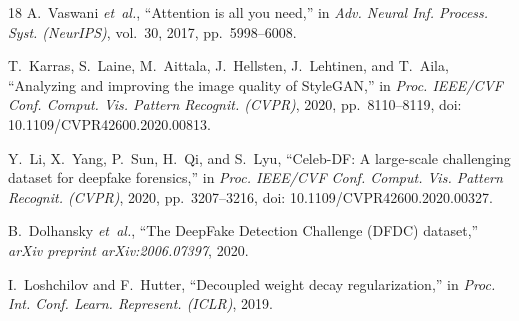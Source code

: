 \documentclass[11pt,a4paper]{article}
\providecommand{\href}[2]{#2}
\begin{document}
\begin{thebibliography}{18}
A.~Vaswani \textit{et~al.},
``Attention is all you need,''
in \textit{Adv. Neural Inf. Process. Syst. (NeurIPS)}, vol.~30, 2017, pp.~5998--6008.

T.~Karras, S.~Laine, M.~Aittala, J.~Hellsten, J.~Lehtinen, and T.~Aila,
``Analyzing and improving the image quality of StyleGAN,''
in \textit{Proc. IEEE/CVF Conf. Comput. Vis. Pattern Recognit. (CVPR)}, 2020, pp.~8110--8119,
doi: \href{https://doi.org/10.1109/CVPR42600.2020.00813}{10.1109/CVPR42600.2020.00813}.

Y.~Li, X.~Yang, P.~Sun, H.~Qi, and S.~Lyu,
``Celeb-DF: A large-scale challenging dataset for deepfake forensics,''
in \textit{Proc. IEEE/CVF Conf. Comput. Vis. Pattern Recognit. (CVPR)}, 2020, pp.~3207--3216,
doi: \href{https://doi.org/10.1109/CVPR42600.2020.00327}{10.1109/CVPR42600.2020.00327}.

B.~Dolhansky \textit{et~al.},
``The DeepFake Detection Challenge (DFDC) dataset,''
\textit{arXiv preprint arXiv:2006.07397}, 2020.

I.~Loshchilov and F.~Hutter,
``Decoupled weight decay regularization,''
in \textit{Proc. Int. Conf. Learn. Represent. (ICLR)}, 2019.

\end{thebibliography}
\end{document}
